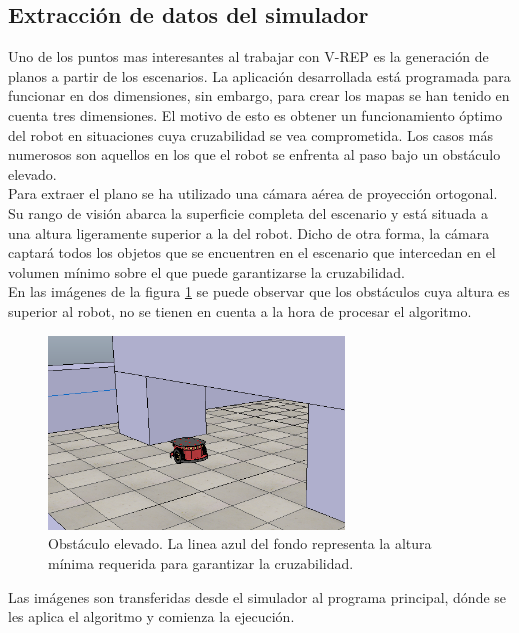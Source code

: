 \subsection{Extracción de datos del simulador}

Uno de los puntos mas interesantes al trabajar con V-REP es la generación de planos a partir de los escenarios. La aplicación desarrollada está programada para funcionar en dos dimensiones, sin embargo, para crear los mapas se han tenido en cuenta tres dimensiones. El motivo de esto es obtener un funcionamiento óptimo del robot en situaciones cuya cruzabilidad se vea comprometida. Los casos más numerosos son aquellos en los que el robot se enfrenta al paso bajo un obstáculo elevado.\\

Para extraer el plano se ha utilizado una cámara aérea de proyección ortogonal. Su rango de visión abarca la superficie completa del escenario y está situada a una altura ligeramente superior a la del robot. Dicho de otra forma, la cámara captará todos los objetos que se encuentren en el escenario que intercedan en el volumen mínimo sobre el que puede garantizarse la cruzabilidad.\\

En las imágenes de la figura \ref{fig:tunel} se puede observar que los obstáculos cuya altura es superior al robot, no se tienen en cuenta a la hora de procesar el algoritmo.\\

	
\begin{figure}[h]
		\centering
        \includegraphics[width=0.7\textwidth]{images/tunel.png}
        \caption{Obstáculo elevado. La linea azul del fondo representa la altura mínima requerida para garantizar la cruzabilidad.}
        \label{fig:tunel}
\end{figure} 

Las imágenes son transferidas desde el simulador al programa principal, dónde se les aplica el algoritmo y comienza la ejecución.

